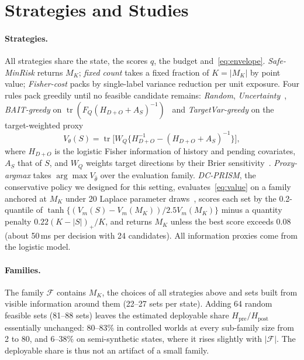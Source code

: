 \documentclass[runningheads]{llncs}
\newcommand{\Hpost}{H_{\mathrm{post}}}
\newcommand{\Hpre}{H_{\mathrm{pre}}}
\begin{document}
\section{Strategies and Studies}
\label{sec:policy}
\paragraph{Strategies.} All strategies share the state, the scores $q$, the budget and~\eqref{eq:envelope}. \emph{Safe-MinRisk} returns $M_K$; \emph{fixed count} takes a fixed fraction of $K=|M_K|$ by point value; \emph{Fisher-cost} packs by single-label variance reduction per unit exposure. Four rules pack greedily until no feasible candidate remains: \emph{Random}, \emph{Uncertainty}~\cite{lewis1994sequential}, \emph{BAIT-greedy} on $\operatorname{tr}(F_Q(H_{D+O}+A_S)^{-1})$~\cite{ash2021fishing} and \emph{TargetVar-greedy} on the target-weighted proxy
\begin{equation}
 V_\theta(S)=\operatorname{tr}\big[W_Q\{H_{D+O}^{-1}-(H_{D+O}+A_S)^{-1}\}\big],\label{eq:value}
\end{equation}
where $H_{D+O}$ is the logistic Fisher information of history and pending covariates, $A_S$ that of $S$, and $W_Q$ weights target directions by their Brier sensitivity~\cite{yu2006transductive,bickfordsmith2023prediction}. \emph{Proxy-argmax} takes $\arg\max V_{\hat\theta}$ over the evaluation family. \emph{DC-PRISM}, the conservative policy we designed for this setting, evaluates~\eqref{eq:value} on a family anchored at $M_K$ under 20 Laplace parameter draws~\cite{mackay1992practical}, scores each set by the 0.2-quantile of $\tanh\{(V_m(S)-V_m(M_K))/2.5V_m(M_K)\}$ minus a quantity penalty $0.22(K-|S|)_+/K$, and returns $M_K$ unless the best score exceeds $0.08$ (about 50\,ms per decision with 24 candidates). All information proxies come from the logistic model.

\paragraph{Families.} The family $\mathcal F$ contains $M_K$, the choices of all strategies above and sets built from visible information around them (22--27 sets per state). Adding 64 random feasible sets (81--88 sets) leaves the estimated deployable share $\Hpre/\Hpost$ essentially unchanged: 80--83\% in controlled worlds at every sub-family size from 2 to 80, and 6--38\% on semi-synthetic states, where it rises slightly with $|\mathcal F|$. The deployable share is thus not an artifact of a small family.
\end{document}
